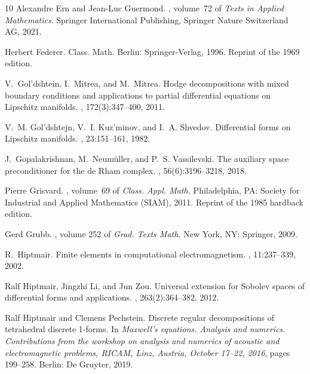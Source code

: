 \documentclass[10pt,a4paper]{amsart}
\theoremstyle{definition}
\theoremstyle{remark}
\numberwithin{equation}{section}
\begin{document}
\begin{thebibliography}{10}
Alexandre Ern and Jean-Luc Guermond.
,
  volume~72 of {\em Texts in Applied Mathematics}.
\newblock Springer International Publishing, Springer Nature Switzerland AG,
  2021.

Herbert Federer.
\newblock Class. Math. Berlin: Springer-Verlag, 1996.
\newblock Reprint of the 1969 edition.

V.~Gol'dshtein, I.~Mitrea, and M.~Mitrea.
\newblock Hodge decompositions with mixed boundary conditions and applications
  to partial differential equations on {Lipschitz} manifolds.
, 172(3):347--400, 2011.

V.~M. Gol'dshtejn, V.~I. Kuz'minov, and I.~A. Shvedov.
\newblock Differential forms on {Lipschitz} manifolds.
, 23:151--161, 1982.

J.~Gopalakrishnan, M.~Neum{\"u}ller, and P.~S. Vassilevski.
\newblock The auxiliary space preconditioner for the de {Rham} complex.
, 56(6):3196--3218, 2018.

Pierre Grisvard.
, volume~69 of {\em
  Class. Appl. Math.}
\newblock Philadelphia, PA: Society for Industrial {and} Applied Mathematics
  (SIAM), 2011.
\newblock Reprint of the 1985 hardback edition.

Gerd Grubb.
, volume 252 of {\em Grad. Texts
  Math.}
\newblock New York, NY: Springer, 2009.

R.~Hiptmair.
\newblock Finite elements in computational electromagnetism.
, 11:237--339, 2002.

Ralf Hiptmair, Jingzhi Li, and Jun Zou.
\newblock Universal extension for {Sobolev} spaces of differential forms and
  applications.
, 263(2):364--382, 2012.

Ralf Hiptmair and Clemens Pechstein.
\newblock Discrete regular decompositions of tetrahedral discrete 1-forms.
\newblock In {\em Maxwell's equations. Analysis and numerics. Contributions
  from the workshop on analysis and numerics of acoustic and electromagnetic
  problems, RICAM, Linz, Austria, October 17--22, 2016}, pages 199--258.
  Berlin: De Gruyter, 2019.


\end{thebibliography}
\end{document}
